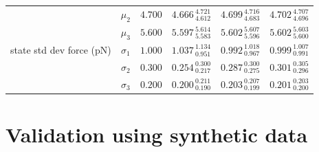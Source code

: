 \documentclass[aps,pre,twocolumn,superscriptaddress,nofootinbib,longbibliography]{revtex4-1}
\begin{document}
{\begin{table}
\begin{tabular*}{\textwidth}{@{\extracolsep{\fill}}lccccc}
& $\mu_{2}$ & $4.700$ & $4.666_{\:4.612}^{\:4.721}$ & $4.699_{\:4.683}^{\:4.716}$ & $4.702_{\:4.696}^{\:4.707}$ \\
& $\mu_{3}$ & $5.600$ & $5.597_{\:5.583}^{\:5.614}$ & $5.602_{\:5.596}^{\:5.607}$ & $5.602_{\:5.600}^{\:5.603}$ \\
\hline
state std dev force (pN) & $\sigma_{1}$ & $1.000$ & $1.037_{\:0.951}^{\:1.134}$ & $0.992_{\:0.967}^{\:1.018}$ & $0.999_{\:0.991}^{\:1.007}$ \\
& $\sigma_{2}$ & $0.300$ & $0.254_{\:0.217}^{\:0.300}$ & $0.287_{\:0.275}^{\:0.300}$ & $0.301_{\:0.296}^{\:0.305}$ \\
& $\sigma_{3}$ & $0.200$ & $0.200_{\:0.190}^{\:0.211}$ & $0.203_{\:0.199}^{\:0.207}$ & $0.201_{\:0.200}^{\:0.203}$ \\
\hline
\end{tabular*}
\end{table}


\section{Validation using synthetic data}
\label{section:model-system}

}
\end{document}
